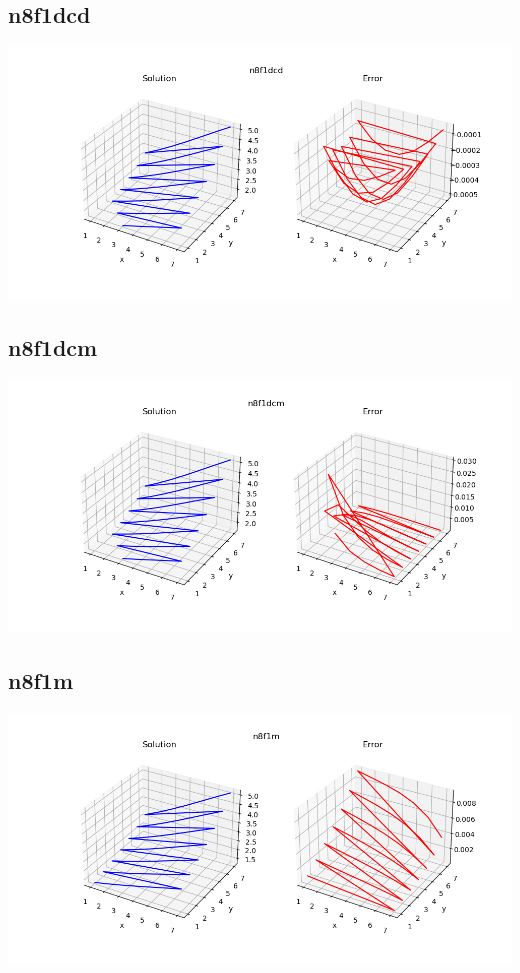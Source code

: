 \subsection*{n8f1dcd}
\includegraphics[scale=0.6]{../../image/n8f1dcd.png}
\subsection*{n8f1dcm}
\includegraphics[scale=0.6]{../../image/n8f1dcm.png}
\subsection*{n8f1m}
\includegraphics[scale=0.6]{../../image/n8f1m.png}
